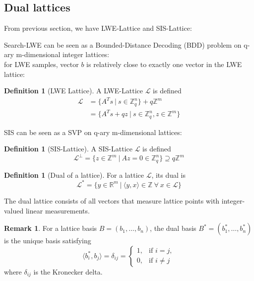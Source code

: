 \documentclass{article}
\theoremstyle{definition}
\newtheorem{defn}[thm]{Definition}
\newtheorem{remark}[thm]{Remark}
\newcommand{\Rr}{\mathbb{R}}
\newcommand{\Zz}{\mathbb{Z}}
\newcommand{\Ll}{\mathcal{L}}
\begin{document}
\subsection{Dual lattices}

From previous section, we have LWE-Lattice and SIS-Lattice:


Search-LWE can be seen as a Bounded-Distance Decoding (BDD) problem on q-ary m-dimensional integer lattices:\\
for LWE samples, vector $b$ is relatively close to exactly one vector in the LWE lattice:
\begin{defn}[LWE Lattice] \label{lwe-lattice}
  A LWE-Lattice $\Ll$ is defined
  \begin{align*}
    \Ll &= \{ A^T s ~|~ s \in \Zz_q^n \} + q \Zz^m\\
	&= \{ A^T s + qz ~|~ s \in \Zz_q^n, z \in \Zz^m \}
  \end{align*}
\end{defn}

SIS can be seen as a SVP on q-ary m-dimensional lattices:
\begin{defn}[SIS-Lattice] \label{sis-lattice}
  A SIS-Lattice $\Ll$ is defined
$$\Ll^\perp = \{ z \in \Zz^m ~|~ Az=0 \in \Zz_q^n \} \supseteq q \Zz^m$$
\end{defn}


\begin{defn}[Dual of a lattice] \label{dual-lattice}
    For a lattice $\Ll$, its dual is
    $$\Ll^* = \{ y \in \Rr^m ~|~ \langle y, x \rangle \in \Zz ~\forall~ x \in \Ll \}$$
\end{defn}
The dual lattice consists of all vectors that measure lattice points with integer-valued linear measurements.

\begin{remark}
  For a lattice basis $B=(b_1, \ldots, b_n)$, the dual basis $B^*=(b_1^*, \ldots, b_n^*)$ is the unique basis satisfying
  $$
    \langle b_i^*, b_j \rangle
    = \delta_{ij} =
      \begin{cases}
	1, & \text{if } i = j, \\
	0, & \text{if } i \neq j
      \end{cases}
  $$
  where $\delta_{ij}$ is the Kronecker delta.
\end{remark}
\end{document}
